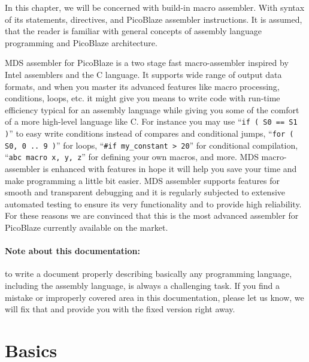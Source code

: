 In this chapter, we will be concerned with build-in macro assembler. With syntax of its statements, directives, and PicoBlaze assembler instructions. It is assumed, that the reader is familiar with general concepts of assembly language programming and PicoBlaze architecture.

MDS assembler for PicoBlaze is a two stage fast macro-assembler inspired by Intel assemblers and the C language. It supports wide range of output data formats, and when you master its advanced features like macro processing, conditions, loops, etc. it might give you means to write code with run-time efficiency typical for an assembly language while giving you some of the comfort of a more high-level language like C. For instance you may use ``\verb'if ( S0 == S1 )''' to easy write conditions instead of compares and conditional jumps, ``\verb'for ( S0, 0 .. 9 )''' for loops, ``\verb'#if my_constant > 20''' for conditional compilation, ``\verb'abc macro x, y, z''' for defining your own macros, and more. MDS macro-assembler is enhanced with features in hope it will help you save your time and make programming a little bit easier. MDS assembler supports features for smooth and transparent debugging and it is regularly subjected to extensive automated testing to ensure its very functionality and to provide high reliability. For these reasons we are convinced that this is the most advanced assembler for PicoBlaze currently available on the market.

\paragraph{Note about this documentation:}to write a document properly describing basically any programming language, including the assembly language, is always a challenging task. If you find a mistake or improperly covered area in this documentation, please let us know, we will fix that and provide you with the fixed version right away.

\section{Basics}
